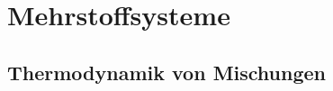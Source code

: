 \vspace{-7pt}

\section{Mehrstoffsysteme}


\vspace{-3pt}

\subsection{Thermodynamik von Mischungen}



\vspace{-5pt}

